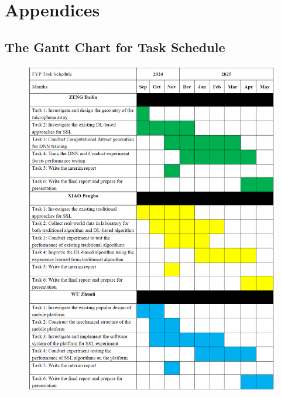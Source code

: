 \chapter*{Appendices}

\section*{The Gantt Chart for Task Schedule}
\begin{figure}[H]
    \centering
    \includegraphics[width=1\linewidth]{figures/Gantt_chart.png}
\end{figure}



